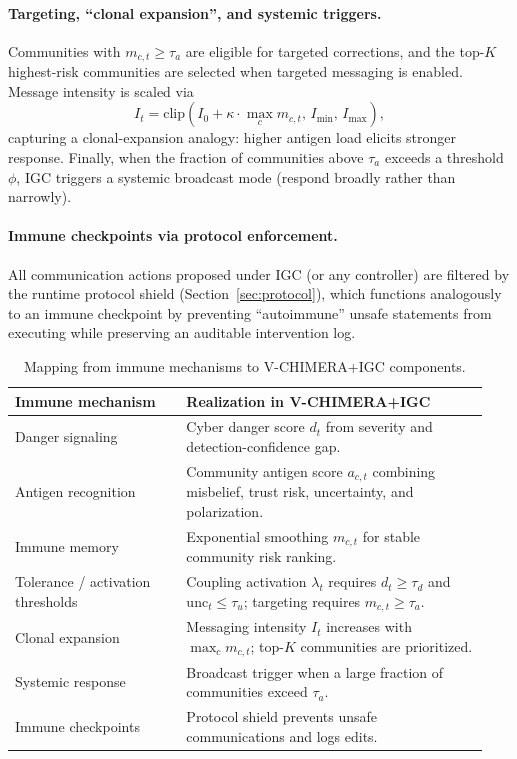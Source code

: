 \documentclass[biomimetics,article,submit,pdftex,moreauthors]{Definitions/mdpi}
\begin{document}
\paragraph{Targeting, ``clonal expansion'', and systemic triggers.}
Communities with $m_{c,t} \ge \tau_a$ are eligible for targeted corrections, and the top-$K$ highest-risk communities are selected when targeted messaging is enabled.
Message intensity is scaled via
\begin{equation}
I_t = \mathrm{clip}\!\left(I_0 + \kappa \cdot \max_c m_{c,t},\, I_{\min},\, I_{\max}\right),
\end{equation}
capturing a clonal-expansion analogy: higher antigen load elicits stronger response.
Finally, when the fraction of communities above $\tau_a$ exceeds a threshold $\phi$, IGC triggers a systemic broadcast mode (respond broadly rather than narrowly).

\paragraph{Immune checkpoints via protocol enforcement.}
All communication actions proposed under IGC (or any controller) are filtered by the runtime protocol shield (Section~\ref{sec:protocol}), which functions analogously to an immune checkpoint by preventing ``autoimmune'' unsafe statements from executing while preserving an auditable intervention log.

\begin{table}[t]
\centering
\caption{Mapping from immune mechanisms to V-CHIMERA+IGC components.}
\label{tab:immune_mapping}
\small
\setlength{\tabcolsep}{4pt}
\begin{tabular}{p{0.34\linewidth}p{0.60\linewidth}}
\toprule
Immune mechanism & Realization in V-CHIMERA+IGC \\
\midrule
Danger signaling \citep{matzinger1994tolerance} & Cyber danger score $d_t$ from severity and detection-confidence gap. \\
Antigen recognition & Community antigen score $a_{c,t}$ combining misbelief, trust risk, uncertainty, and polarization. \\
Immune memory & Exponential smoothing $m_{c,t}$ for stable community risk ranking. \\
Tolerance / activation thresholds & Coupling activation $\lambda_t$ requires $d_t\ge\tau_d$ and $\mathrm{unc}_t\le\tau_u$; targeting requires $m_{c,t}\ge\tau_a$. \\
Clonal expansion & Messaging intensity $I_t$ increases with $\max_c m_{c,t}$; top-$K$ communities are prioritized. \\
Systemic response & Broadcast trigger when a large fraction of communities exceed $\tau_a$. \\
Immune checkpoints & Protocol shield prevents unsafe communications and logs edits. \\
\bottomrule
\end{tabular}
\end{table}
\end{document}
